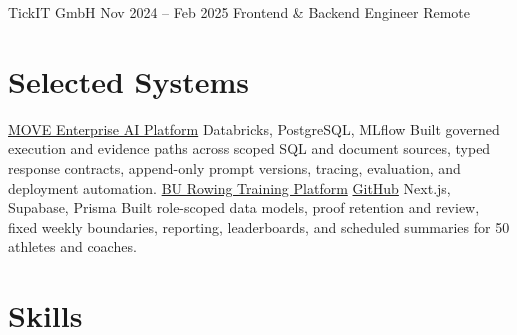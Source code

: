 \ResumeEntry
  {TickIT GmbH}
  {Nov 2024 -- Feb 2025}
  {Frontend \& Backend Engineer}
  {Remote}
\begin{ResumeItems}
\end{ResumeItems}

\section{Selected Systems}
\ProjectEntry
  {\href{https://www.giacomocappelletto.com/projects/move}{MOVE Enterprise AI Platform}}
  {Databricks, PostgreSQL, MLflow}
  {Built governed execution and evidence paths across scoped SQL and document sources, typed response contracts, append-only prompt versions, tracing, evaluation, and deployment automation.}
\ProjectEntry
  {\href{https://rowbook.vercel.app/}{BU Rowing Training Platform} \enspace\textbar\enspace \href{https://github.com/JJCAPPE/rowbook}{GitHub}}
  {Next.js, Supabase, Prisma}
  {Built role-scoped data models, proof retention and review, fixed weekly boundaries, reporting, leaderboards, and scheduled summaries for 50 athletes and coaches.}

\AthleticsAwards

\section{Skills}

